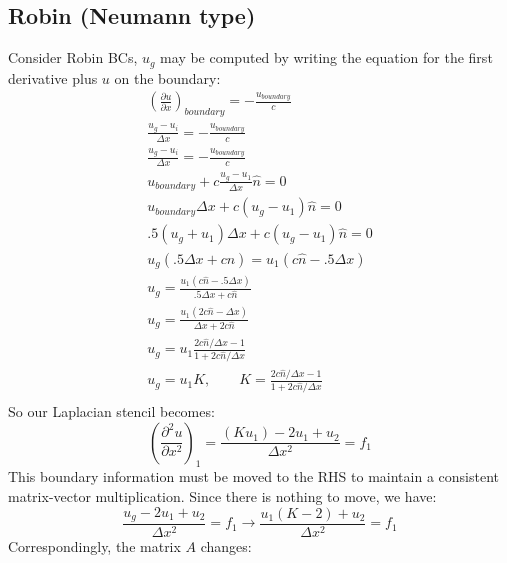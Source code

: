 \documentclass[landscape]{article}
\begin{document}
\subsection{Robin (Neumann type)}
Consider Robin BCs, $u_g$ may be computed by writing the equation for the first derivative plus $u$ on the boundary:
\begin{equation}\begin{aligned}
  \left(\frac{\partial u}{\partial x}\right)_{boundary} = -\frac{u_{boundary}}{c} \\
  \frac{u_g - u_i}{\Delta x} = -\frac{u_{boundary}}{c} \\
  \frac{u_g - u_i}{\Delta x} = -\frac{u_{boundary}}{c} \\
  u_{boundary} + c \frac{u_g - u_1}{\Delta x} \hat{n} = 0 \\
  u_{boundary} \Delta x + c (u_g - u_1) \hat{n} =  0 \\
  .5 (u_g + u_1) \Delta x + c (u_g - u_1) \hat{n} =  0 \\
  u_g (.5 \Delta x + c \hat{n}) = u_1 (c \hat{n} - .5 \Delta x) \\
  u_g = \frac{u_1 (c \hat{n} - .5 \Delta x)}{.5 \Delta x + c \hat{n}} \\
  u_g = \frac{u_1 (2 c \hat{n} - \Delta x)}{\Delta x + 2 c \hat{n}} \\
  u_g = u_1 \frac{2 c \hat{n}/\Delta x - 1}{1 + 2 c \hat{n}/\Delta x} \\
  u_g = u_1 K, \qquad K = \frac{2 c \hat{n}/\Delta x - 1}{1 + 2 c \hat{n}/\Delta x}  \\
\end{aligned}\end{equation}
So our Laplacian stencil becomes:
\begin{equation}
   \left(\frac{\partial^2 u}{\partial x^2}\right)_{1} =
   \frac{(K u_1) - 2 u_1 + u_{2}}{\Delta x^2} = f_1
\end{equation}
This boundary information must be moved to the RHS to maintain a consistent matrix-vector multiplication. Since there is nothing to move, we have:
\begin{equation}
   \frac{u_g - 2 u_1 + u_{2}}{\Delta x^2} = f_1
   \rightarrow
   \frac{u_1(K-2) + u_{2}}{\Delta x^2} = f_1
\end{equation}
Correspondingly, the matrix $A$ changes:
\end{document}
